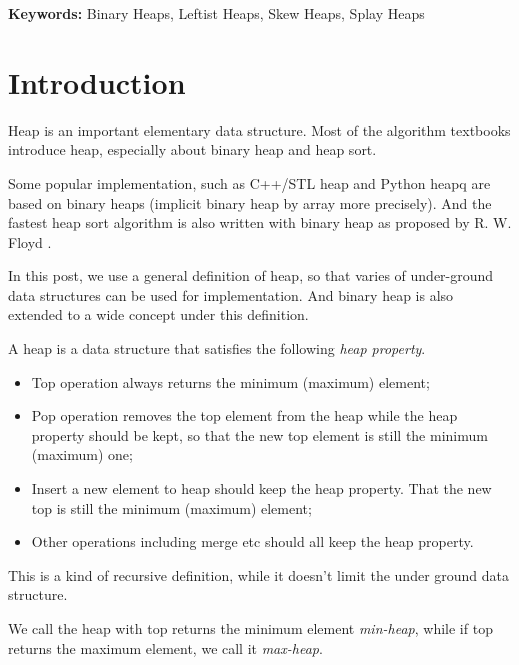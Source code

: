 \documentclass{article}
\begin{document}
\vspace{3cm}
{\bfseries Keywords:} Binary Heaps, Leftist Heaps, Skew Heaps, Splay Heaps


\maketitle

\section{Introduction}
\label{introduction}

Heap is an important elementary data structure. Most of the algorithm
textbooks introduce heap, especially about binary heap and heap sort.

Some popular implementation, such as C++/STL heap and Python heapq
are based on binary heaps (implicit binary heap by array
more precisely). And the fastest heap sort algorithm is also
written with binary heap as proposed by R. W. Floyd
\cite{wiki-heapsort} \cite{rosetta-heapsort}.

In this post, we use a general definition of heap, so that
varies of under-ground data structures can be used for implementation.
And binary heap is also extended to a wide concept under this definition.

A heap is a data structure that satisfies the following {\em heap property}.
\begin{itemize}
\item Top operation always returns the minimum (maximum) element;
\item Pop operation removes the top element from the heap while the heap
property should be kept, so that the new top element is still the 
minimum (maximum) one;
\item Insert a new element to heap should keep the heap property. That
the new top is still the minimum (maximum) element;
\item Other operations including merge etc should all keep the heap property.
\end{itemize}

This is a kind of recursive definition, while it doesn't limit the under
ground data structure.

We call the heap with top returns the minimum element {\em min-heap},
while if top returns the maximum element, we call it {\em max-heap}.
\end{document}
